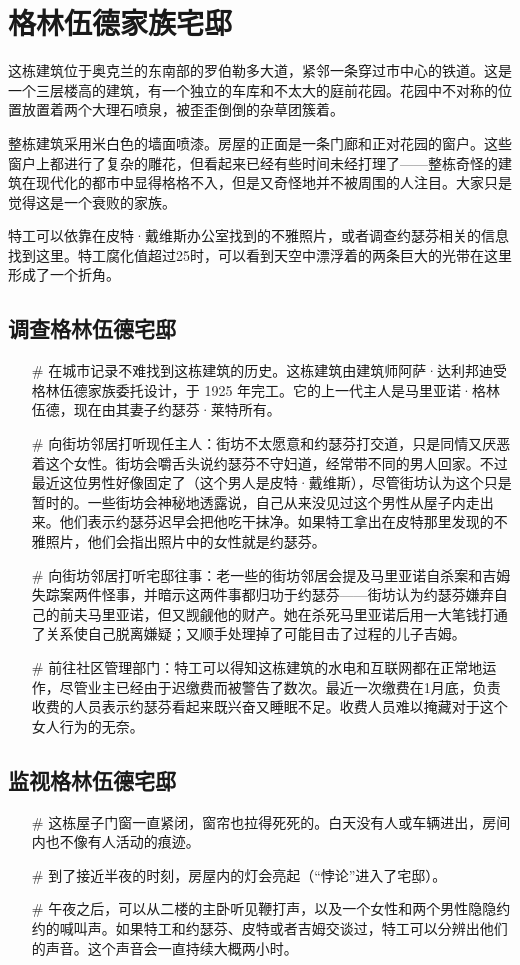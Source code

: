 \section{格林伍德家族宅邸}

这栋建筑位于奥克兰的东南部的罗伯勒多大道，紧邻一条穿过市中心的铁道。这是一个三层楼高的建筑，有一个独立的车库和不太大的庭前花园。花园中不对称的位置放置着两个大理石喷泉，被歪歪倒倒的杂草团簇着。

整栋建筑采用米白色的墙面喷漆。房屋的正面是一条门廊和正对花园的窗户。这些窗户上都进行了复杂的雕花，但看起来已经有些时间未经打理了——整栋奇怪的建筑在现代化的都市中显得格格不入，但是又奇怪地并不被周围的人注目。大家只是觉得这是一个衰败的家族。

特工可以依靠在皮特·戴维斯办公室找到的不雅照片，或者调查约瑟芬相关的信息找到这里。特工腐化值超过25时，可以看到天空中漂浮着的两条巨大的光带在这里形成了一个折角。

\subsection{调查格林伍德宅邸}

\begin{itemize}
    \item[\#] 在城市记录不难找到这栋建筑的历史。这栋建筑由建筑师阿萨·达利邦迪受格林伍德家族委托设计，于 1925 年完工。它的上一代主人是马里亚诺·格林伍德，现在由其妻子约瑟芬·莱特所有。
    \item[\#] 向街坊邻居打听现任主人：街坊不太愿意和约瑟芬打交道，只是同情又厌恶着这个女性。街坊会嚼舌头说约瑟芬不守妇道，经常带不同的男人回家。不过最近这位男性好像固定了（这个男人是皮特·戴维斯），尽管街坊认为这个只是暂时的。一些街坊会神秘地透露说，自己从来没见过这个男性从屋子内走出来。他们表示约瑟芬迟早会把他吃干抹净。如果特工拿出在皮特那里发现的不雅照片，他们会指出照片中的女性就是约瑟芬。
    \item[\#] 向街坊邻居打听宅邸往事：老一些的街坊邻居会提及马里亚诺自杀案和吉姆失踪案两件怪事，并暗示这两件事都归功于约瑟芬——街坊认为约瑟芬嫌弃自己的前夫马里亚诺，但又觊觎他的财产。她在杀死马里亚诺后用一大笔钱打通了关系使自己脱离嫌疑；又顺手处理掉了可能目击了过程的儿子吉姆。
    \item[\#] 前往社区管理部门：特工可以得知这栋建筑的水电和互联网都在正常地运作，尽管业主已经由于迟缴费而被警告了数次。最近一次缴费在1月底，负责收费的人员表示约瑟芬看起来既兴奋又睡眠不足。收费人员难以掩藏对于这个女人行为的无奈。
\end{itemize}

\subsection{监视格林伍德宅邸}
\begin{itemize}
    \item[\#] 这栋屋子门窗一直紧闭，窗帘也拉得死死的。白天没有人或车辆进出，房间内也不像有人活动的痕迹。
    \item[\#] 到了接近半夜的时刻，房屋内的灯会亮起（“悖论”进入了宅邸）。
    \item[\#] 午夜之后，可以从二楼的主卧听见鞭打声，以及一个女性和两个男性隐隐约约的喊叫声。如果特工和约瑟芬、皮特或者吉姆交谈过，特工可以分辨出他们的声音。这个声音会一直持续大概两小时。
\end{itemize}

